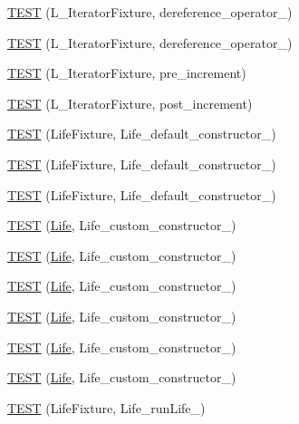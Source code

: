 \begin{DoxyCompactItemize}
\item 
\hyperlink{TestLife_8c_09_09_a367c3da29be5fab5215dc9009b495c9c}{T\-E\-S\-T} (L\-\_\-\-Iterator\-Fixture, dereference\-\_\-operator\-\_)
\item 
\hyperlink{TestLife_8c_09_09_a07719833d6b18968c7dd9b2a7ba4dabd}{T\-E\-S\-T} (L\-\_\-\-Iterator\-Fixture, dereference\-\_\-operator\-\_)
\item 
\hyperlink{TestLife_8c_09_09_a83109c2206a7cd87b799d8b27be8361b}{T\-E\-S\-T} (L\-\_\-\-Iterator\-Fixture, pre\-\_\-increment)
\item 
\hyperlink{TestLife_8c_09_09_a0bfd7ba5258cd72d87edc0d3e0dbb5fa}{T\-E\-S\-T} (L\-\_\-\-Iterator\-Fixture, post\-\_\-increment)
\item 
\hyperlink{TestLife_8c_09_09_ad2669bf374ceab6e38e243f82576d306}{T\-E\-S\-T} (Life\-Fixture, Life\-\_\-default\-\_\-constructor\-\_)
\item 
\hyperlink{TestLife_8c_09_09_a6635e082832cba6bb69382752ddf63cc}{T\-E\-S\-T} (Life\-Fixture, Life\-\_\-default\-\_\-constructor\-\_)
\item 
\hyperlink{TestLife_8c_09_09_a2ba8ca688b69c27c87b15363003b7fd4}{T\-E\-S\-T} (Life\-Fixture, Life\-\_\-default\-\_\-constructor\-\_)
\item 
\hyperlink{TestLife_8c_09_09_a3c715dd78cf4eef661e8d70c8e069d74}{T\-E\-S\-T} (\hyperlink{classLife}{Life}, Life\-\_\-custom\-\_\-constructor\-\_)
\item 
\hyperlink{TestLife_8c_09_09_ac9649c48c2c2ba2b6524d3e63afa62aa}{T\-E\-S\-T} (\hyperlink{classLife}{Life}, Life\-\_\-custom\-\_\-constructor\-\_)
\item 
\hyperlink{TestLife_8c_09_09_a537e8eaaf6274394d1e8100fb1333993}{T\-E\-S\-T} (\hyperlink{classLife}{Life}, Life\-\_\-custom\-\_\-constructor\-\_)
\item 
\hyperlink{TestLife_8c_09_09_af7b54d3858b9fb10a2bb85cb4972dcd3}{T\-E\-S\-T} (\hyperlink{classLife}{Life}, Life\-\_\-custom\-\_\-constructor\-\_)
\item 
\hyperlink{TestLife_8c_09_09_afc00d5ae99229e4f3807c53aaf02b808}{T\-E\-S\-T} (\hyperlink{classLife}{Life}, Life\-\_\-custom\-\_\-constructor\-\_)
\item 
\hyperlink{TestLife_8c_09_09_aa86985d9fb332be6e010a9d3abb80d9d}{T\-E\-S\-T} (\hyperlink{classLife}{Life}, Life\-\_\-custom\-\_\-constructor\-\_)
\item 
\hyperlink{TestLife_8c_09_09_afc371bca626175f5ef7e84a3bde673c0}{T\-E\-S\-T} (Life\-Fixture, Life\-\_\-run\-Life\-\_)

\end{DoxyCompactItemize}
